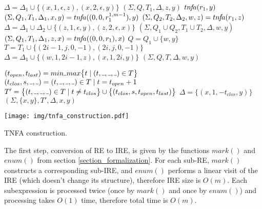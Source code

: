 \documentclass[AMA,STIX1COL]{WileyNJD-v2}
\let\oldnl\nl
\newcommand{\nonl}{\renewcommand{\nl}{\let\nl\oldnl}} %
\newcommand{\Xund}{\rule{.4em}{.4pt}}
\begin{document}
\begin{algorithm}[]
\begin{multicols}{2}
{{            $\Delta = \Delta_1 \cup \big\{ (x, 1, \epsilon, z), (x, 2, \epsilon, y) \big\}$ \;
            \Return $(\Sigma, Q, T_1, \Delta, z, y)$
        }
        \BlankLine
         {
            \Return $tn\!f\!a (r_1, y)$
        }
        \BlankLine
         {
            $(\Sigma, Q_1, T_1, \Delta_1, x, y) = tn\!f\!a ((0, 0, r_1^{1,m-1}), y)$ \;
            $(\Sigma, Q_2, T_2, \Delta_2, w, z) = tn\!f\!a (r_1, z)$ \;
            $\Delta = \Delta_1 \cup \Delta_2 \cup \big\{ (z, 1, \epsilon, y), (z, 2, \epsilon, x) \big\}$ \;
            \Return $(\Sigma, Q_1 \cup Q_2, T_1 \cup T_2, \Delta, w, y)$
        }
        \BlankLine
         {
            $(\Sigma, Q_1, T_1, \Delta_1, z, x) = tn\!f\!a ((0, 0, r_1), x)$ \;
            $Q = Q_1 \cup \{w, y\}$ \;
            $T = T_1 \cup \big\{ (2i\!-\!1, j, 0, -1), (2i, j, 0, -1) \big\}$ \;
            $\Delta = \Delta_1 \cup \big\{ (w, 1, 2i\!-\!1, z), (x, 1, 2i, y) \big\}$ \;
            \Return $(\Sigma, Q, T, \Delta, w, y)$
        }
    }
    \BlankLine
    \BlankLine

     {
        $(t_{open}, t_{last}) = min \Xund max \big\{ t \mid (t, \Xund, \Xund, \Xund) \in T \big\}$ \;
        $(t_{clos}, s, \Xund, \Xund) = (t, \Xund, \Xund, \Xund) \in T \mid t = t_{open} + 1$ \;
        $T' = \big\{ (t, \Xund, \Xund, \Xund) \in T \mid t \neq t_{clos} \big\} \cup \big\{ (t_{clos}, s, t_{open}, t_{last}) \big\}$ \;
        $\Delta = \big\{ (x, 1, -t_{clos}, y) \big\}$ \;
        \Return $(\Sigma, \{x, y\}, T', \Delta, x, y)$ \;
    }

    \vfill

\columnbreak

    \nonl \texttt{[image: img/tnfa\_construction.pdf]}

\end{multicols}
\vspace{0.5em}
\caption{TNFA construction.}\label{alg_tnfa}
\end{algorithm}

The first step, conversion of RE to IRE, is given by the functions $mark()$ and $enum()$ from section \ref{section_formalization}.
%
For each sub-RE, $mark()$ constructs a corresponding sub-IRE,
and $enum()$ performs a linear visit of the IRE (which doesn't change its structure),
therefore IRE size is $O(m)$.
%
Each subexpression is processed twice (once by $mark()$ and once by $enum()$)
and processing takes $O(1)$ time, therefore total time is $O(m)$.
\\
\end{document}

